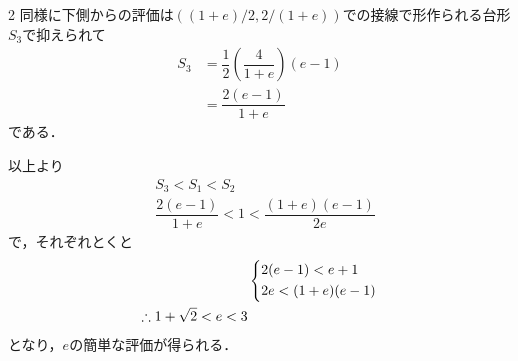 \documentclass[../../main.tex]{subfiles}
\begin{document}
\begin{multicols}{2}
  同様に下側からの評価は$((1+e)/2,2/(1+e))$での接線で形作られる台形$S_3$で抑えられて
  \begin{align}
    S_3
    & = \dfrac{1}{2}\left(\dfrac{4}{1+e}\right)\left(e-1\right) \\
    & = \dfrac{2(e-1)}{1+e}
  \end{align}
  である．

  以上より
  \begin{align}
    & S_3 < S_1 < S_2                                \\
    & \dfrac{2(e-1)}{1+e} < 1 < \dfrac{(1+e)(e-1)}{2e}
  \end{align}
  で，それぞれとくと
  \begin{align}
    &
    \begin{dcases}
      2(e-1) < e+1 \\
      2e < (1+e)(e-1)
    \end{dcases} \\
    \therefore
    1+\sqrt{2} < e < 3
  \end{align}
  となり，$e$の簡単な評価が得られる．

  \newpage
\end{multicols}
\end{document}
